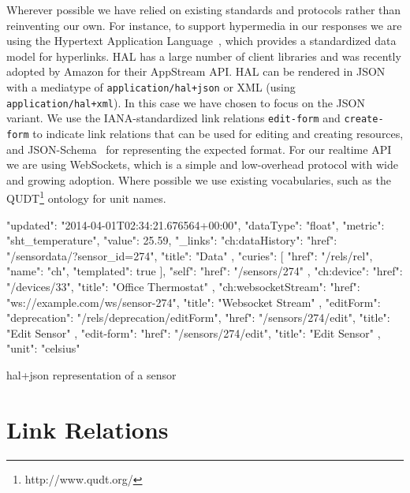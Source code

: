 \documentclass{acm_proc_article-sp}
\begin{document}
Wherever possible we have relied on existing standards and protocols rather
than reinventing our own. For instance, to support hypermedia in our responses
we are using the Hypertext Application Language~\cite{json-hal-draft}, which
provides a standardized data model for hyperlinks. HAL has a large number of
client libraries and was recently adopted by Amazon for their AppStream API.
HAL can be rendered in JSON with a mediatype of \texttt{application/hal+json}
or XML (using \mbox{\texttt{application/hal+xml}}). In this case we have chosen to focus on
the JSON variant. We use the IANA-standardized link relations
\texttt{edit-form} and \texttt{create-form} to indicate link relations that can
be used for editing and creating resources, and
JSON-Schema~\cite{json-schema-draft} for representing the expected format. For
our realtime API we are using WebSockets, which is a simple and low-overhead
protocol with wide and growing adoption. Where possible we use existing
vocabularies, such as the QUDT\footnote{http://www.qudt.org/} ontology for unit
names.

\begin{listing}
\begin{jsoncode}
  {
    "updated": "2014-04-01T02:34:21.676564+00:00",
    "dataType": "float",
    "metric": "sht_temperature",
    "value": 25.59,
    "_links": {
      "ch:dataHistory": {
        "href": "/sensordata/?sensor_id=274",
        "title": "Data"
      },
      "curies": [
        {
          "href": "/rels/{rel}",
          "name": "ch",
          "templated": true
        }
      ],
      "self": {
        "href": "/sensors/274"
      },
      "ch:device": {
        "href": "/devices/33",
        "title": "Office Thermostat"
      },
      "ch:websocketStream": {
        "href": "ws://example.com/ws/sensor-274",
        "title": "Websocket Stream"
      },
      "editForm": {
        "deprecation": "/rels/deprecation/editForm",
        "href": "/sensors/274/edit",
        "title": "Edit Sensor"
      },
      "edit-form": {
        "href": "/sensors/274/edit",
        "title": "Edit Sensor"
      }
    },
    "unit": "celsius"
  }
\end{jsoncode}
\caption{hal+json representation of a sensor}
\label{sensorjson}
\end{listing}

\section{Link Relations}
\end{document}
